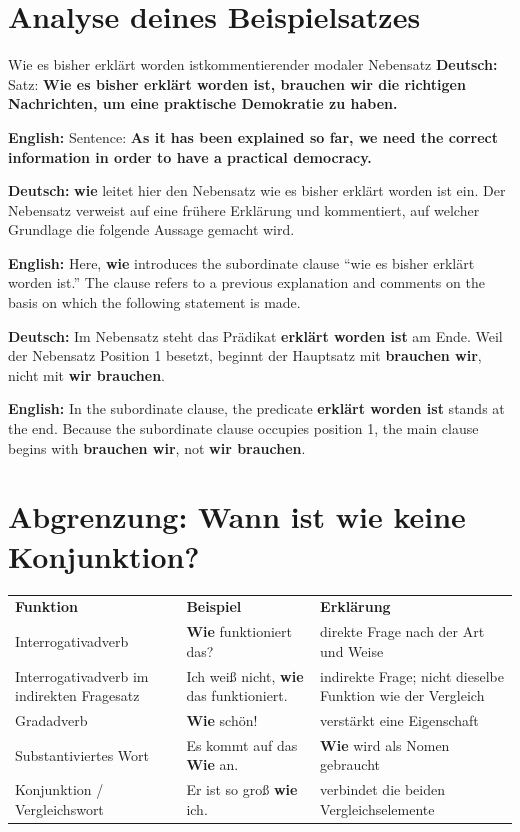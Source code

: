 \documentclass[a4paper,11pt]{article}
\newcommand{\GermanText}[1]{\textbf{Deutsch: }#1\par}
\newcommand{\EnglishText}[1]{{\small\color{SoftGray}\textbf{English: }#1\par}}
\newcommand{\TableHead}[1]{\cellcolor{HeaderBlueDark}\color{white}\textbf{#1}}
\begin{document}
\section{Analyse deines Beispielsatzes}

\begin{grammarentry}{Wie es bisher erklärt worden ist}{kommentierender modaler Nebensatz}
\GermanText{Satz: \textbf{Wie es bisher erklärt worden ist, brauchen wir die richtigen Nachrichten, um eine praktische Demokratie zu haben.}}
\EnglishText{Sentence: \textbf{As it has been explained so far, we need the correct information in order to have a practical democracy.}}

\GermanText{\textbf{wie} leitet hier den Nebensatz \glqq wie es bisher erklärt worden ist\grqq{} ein. Der Nebensatz verweist auf eine frühere Erklärung und kommentiert, auf welcher Grundlage die folgende Aussage gemacht wird.}
\EnglishText{Here, \textbf{wie} introduces the subordinate clause ``wie es bisher erklärt worden ist.'' The clause refers to a previous explanation and comments on the basis on which the following statement is made.}

\GermanText{Im Nebensatz steht das Prädikat \textbf{erklärt worden ist} am Ende. Weil der Nebensatz Position 1 besetzt, beginnt der Hauptsatz mit \textbf{brauchen wir}, nicht mit \textbf{wir brauchen}.}
\EnglishText{In the subordinate clause, the predicate \textbf{erklärt worden ist} stands at the end. Because the subordinate clause occupies position 1, the main clause begins with \textbf{brauchen wir}, not \textbf{wir brauchen}.}
\end{grammarentry}

\section{Abgrenzung: Wann ist \glqq wie\grqq{} keine Konjunktion?}

\begin{longtable}{>{\raggedright\arraybackslash}p{}>{\raggedright\arraybackslash}p{}>{\raggedright\arraybackslash}p{}}
\TableHead{Funktion} & \TableHead{Beispiel} & \TableHead{Erklärung} \\
Interrogativadverb & \textbf{Wie} funktioniert das? & direkte Frage nach der Art und Weise\\
Interrogativadverb im indirekten Fragesatz & Ich weiß nicht, \textbf{wie} das funktioniert. & indirekte Frage; nicht dieselbe Funktion wie der Vergleich\\
Gradadverb & \textbf{Wie} schön! & verstärkt eine Eigenschaft\\
Substantiviertes Wort & Es kommt auf das \textbf{Wie} an. & \textbf{Wie} wird als Nomen gebraucht\\
Konjunktion / Vergleichswort & Er ist so groß \textbf{wie} ich. & verbindet die beiden Vergleichselemente\\
\end{longtable}
\end{document}
